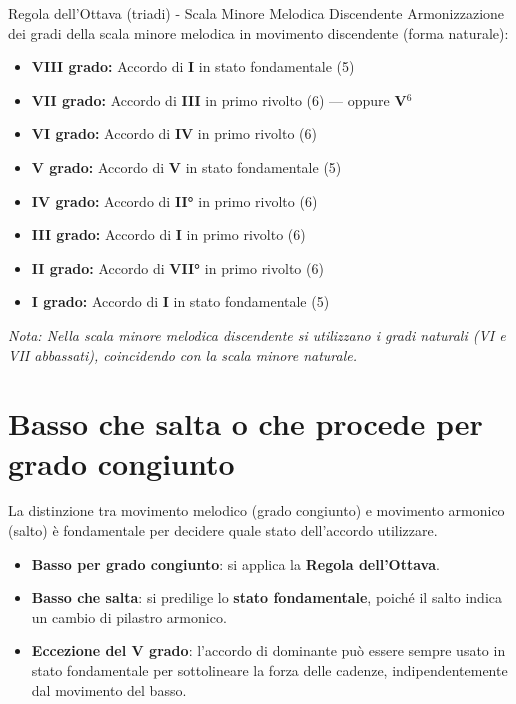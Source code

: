 \begin{regola}{Regola dell'Ottava (triadi) - Scala Minore Melodica Discendente}
	\label{reg:regola_ottava_melodica_disc}
	Armonizzazione dei gradi della scala minore melodica in movimento discendente (forma naturale):
	
	\begin{itemize}
		\item \textbf{VIII grado:} Accordo di \textbf{I} in stato fondamentale (5)
		\item \textbf{VII grado:} Accordo di \textbf{III} in primo rivolto (6) — oppure \textbf{V}$^6$
		\item \textbf{VI grado:} Accordo di \textbf{IV} in primo rivolto (6)
		\item \textbf{V grado:} Accordo di \textbf{V} in stato fondamentale (5)
		\item \textbf{IV grado:} Accordo di \textbf{II°} in primo rivolto (6)
		\item \textbf{III grado:} Accordo di \textbf{I} in primo rivolto (6)
		\item \textbf{II grado:} Accordo di \textbf{VII°} in primo rivolto (6)
		\item \textbf{I grado:} Accordo di \textbf{I} in stato fondamentale (5)
	\end{itemize}
	
	\textit{Nota: Nella scala minore melodica discendente si utilizzano i gradi naturali (VI e VII abbassati), coincidendo con la scala minore naturale.}
\end{regola}


\section{Basso che salta o che procede per grado congiunto}
\label{sec:basso_salti_gradi}

La distinzione tra movimento melodico (grado congiunto) e movimento armonico (salto) è fondamentale per decidere quale stato dell'accordo utilizzare.

\begin{regola}
	\label{reg:stato_basso}
	\begin{itemize}
		\item \textbf{Basso per grado congiunto}: si applica la \textbf{Regola dell'Ottava}.
		\item \textbf{Basso che salta}: si predilige lo \textbf{stato fondamentale}, poiché il salto indica un cambio di pilastro armonico.
		\item \textbf{Eccezione del V grado}: l'accordo di dominante può essere sempre usato in stato fondamentale per sottolineare la forza delle cadenze, indipendentemente dal movimento del basso.
	\end{itemize}
\end{regola}


